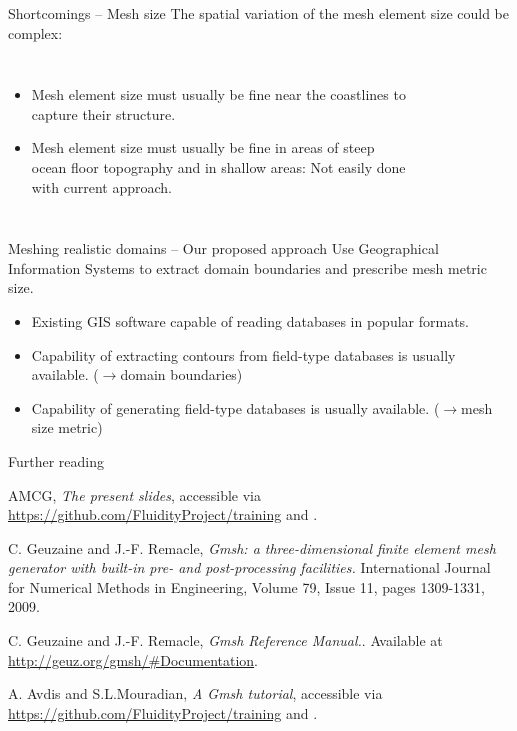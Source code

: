 \documentclass[t]{beamer}
\begin{document}
\begin{frame}{Shortcomings -- Mesh size}
The spatial variation of the mesh element size could be complex:
\begin{columns}
\begin{itemize}
   \item Mesh element size must usually be fine near the coastlines to capture their structure.\\[15pt]
   \item Mesh element size must usually be fine in areas of steep ocean floor topography and in shallow areas: Not easily done with current approach.
\end{itemize}
\begin{figure}[htbp!]
 \centering
\end{figure}
\end{columns}
\end{frame}

\begin{frame}{Meshing realistic domains -- Our proposed approach}
Use Geographical Information Systems to extract domain boundaries and prescribe mesh metric size.
\begin{itemize}
   \item Existing GIS software capable of reading databases in popular formats.
   \item Capability of extracting contours from field-type databases is usually available. ($\rightarrow$domain boundaries)
   \item Capability of generating field-type databases is usually available. ($\rightarrow$mesh size metric)
\end{itemize}
\end{frame}

\begin{frame}{Further reading}
\begin{thebibliography}{9}

  AMCG, 
  \emph{The present slides},
  accessible via \href{GitHub}{https://github.com/FluidityProject/training} and \href{Figshare}{}.

  C. Geuzaine and J.-F. Remacle,
  \emph{Gmsh: a three-dimensional finite element mesh generator with built-in pre- and post-processing facilities.}
  International Journal for Numerical Methods in Engineering,
  Volume 79, Issue 11,
  pages 1309-1331, 2009.

  C. Geuzaine and J.-F. Remacle,
  \emph{Gmsh Reference Manual.}.
  Available at
  \url{http://geuz.org/gmsh/\#Documentation}.

  A. Avdis and S.L.Mouradian,
  \emph{A Gmsh tutorial},
  accessible via \href{GitHub}{https://github.com/FluidityProject/training} and \href{Figshare}{}.

  \end{thebibliography}

\end{frame}
\end{document}
